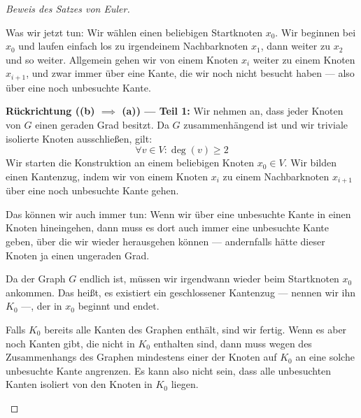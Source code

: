 \begin{proof}[Beweis des Satzes von Euler]
\begin{spoken-clean}[00:11:15 - 00:13:38]
Was wir jetzt tun: Wir wählen einen beliebigen Startknoten $x_0$. Wir beginnen bei $x_0$ und laufen einfach los zu irgendeinem Nachbarknoten $x_1$, dann weiter zu $x_2$ und so weiter. Allgemein gehen wir von einem Knoten $x_i$ weiter zu einem Knoten $x_{i+1}$, und zwar immer über eine Kante, die wir noch nicht besucht haben --- also über eine noch unbesuchte Kante.
\end{spoken-clean}

\begin{ai-global-state-checkpoint-invisible-content}
\end{ai-global-state-checkpoint-invisible-content}

\begin{math-stroke}
\textbf{Rückrichtung (\texorpdfstring{\textbf{(b)} $\implies$ \textbf{(a)}}{b -> a}) --- Teil 1:}
Wir nehmen an, dass jeder Knoten von $G$ einen geraden Grad besitzt. Da $G$ zusammenhängend ist und wir triviale isolierte Knoten ausschließen, gilt:
\[
\forall v \in V \colon \deg(v) \ge 2
\]
Wir starten die Konstruktion an einem beliebigen Knoten $x_0 \in V$. Wir bilden einen Kantenzug, indem wir von einem Knoten $x_i$ zu einem Nachbarknoten $x_{i+1}$ über eine noch unbesuchte Kante gehen.
\end{math-stroke}

\begin{spoken-clean}[00:13:38 - 00:15:10]
Das können wir auch immer tun: Wenn wir über eine unbesuchte Kante in einen Knoten hineingehen, dann muss es dort auch immer eine unbesuchte Kante geben, über die wir wieder herausgehen können --- andernfalls hätte dieser Knoten ja einen ungeraden Grad.

Da der Graph $G$ endlich ist, müssen wir irgendwann wieder beim Startknoten $x_0$ ankommen. Das heißt, es existiert ein geschlossener Kantenzug --- nennen wir ihn $K_0$ ---, der in $x_0$ beginnt und endet.

Falls $K_0$ bereits alle Kanten des Graphen enthält, sind wir fertig. Wenn es aber noch Kanten gibt, die nicht in $K_0$ enthalten sind, dann muss wegen des Zusammenhangs des Graphen mindestens einer der Knoten auf $K_0$ an eine solche unbesuchte Kante angrenzen. Es kann also nicht sein, dass alle unbesuchten Kanten isoliert von den Knoten in $K_0$ liegen.
\end{spoken-clean}


\end{proof}

